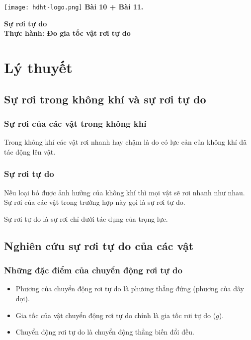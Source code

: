 \newcommand{\chapter}[2][]{
	\newcommand{\chapname}{#2}
	\begin{flushleft}
		\begin{minipage}[t]{\linewidth}
			\texttt{[image: hdht-logo.png]}
			\hspace{0pt}	
			\sffamily\bfseries\large Bài  10 + Bài 11.
			\begin{flushleft}
				\LARGE\bfseries #1
			\end{flushleft}
		\end{minipage}
	\end{flushleft}
	\vspace{1cm}
	\normalfont\normalsize
}
\chapter[Sự rơi tự do \\ Thực hành: Đo gia tốc vật rơi tự do]{Sự rơi tự do \\ Thực hành: Đo gia tốc vật rơi tự do}
\section{Lý thuyết}
\subsection{Sự rơi trong không khí và sự rơi tự do}
\subsubsection{Sự rơi của các vật trong không khí}
Trong không khí các vật rơi nhanh hay chậm là do có lực cản của không khí đã tác động lên vật.
\subsubsection{Sự rơi tự do }
Nếu loại bỏ được ảnh hưởng của không khí thì mọi vật sẽ rơi nhanh như nhau. Sự rơi của các vật trong trường hợp này gọi là sự rơi tự do.

Sự rơi tự do là sự rơi chỉ dưới tác dụng của trọng lực.
\subsection{Nghiên cứu sự rơi tự do của các vật}
\subsubsection{Những đặc điểm của chuyển động rơi tự do}
\begin{itemize}
	\item Phương của chuyển động rơi tự do là phương thẳng đứng (phương của dây dọi).
	\item Gia tốc của vật chuyển động rơi tự do chính là gia tốc rơi tự do ($g$).
	\item Chuyển động rơi tự do là chuyển động thẳng biến đổi đều.
\end{itemize}	

